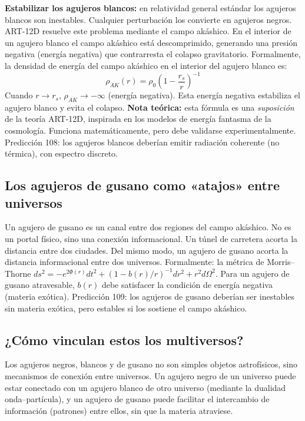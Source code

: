 \textbf{Estabilizar los agujeros blancos:} en relatividad general estándar los agujeros blancos son inestables. Cualquier perturbación los convierte en agujeros negros. ART-12D resuelve este problema mediante el campo akáshico. En el interior de un agujero blanco el campo akáshico está descomprimido, generando una presión negativa (energía negativa) que contrarresta el colapso gravitatorio. Formalmente, la densidad de energía del campo akáshico en el interior del agujero blanco es:
\begin{equation}
\rho_{AK}(r) = \rho_0 \left(1 - \frac{r_s}{r}\right)^{-1}
\end{equation}
Cuando $r \to r_s$, $\rho_{AK} \to -\infty$ (energía negativa). Esta energía negativa estabiliza el agujero blanco y evita el colapso. \textbf{Nota teórica:} esta fórmula es una \textit{suposición} de la teoría ART-12D, inspirada en los modelos de energía fantasma de la cosmología. Funciona matemáticamente, pero debe validarse experimentalmente. Predicción 108: los agujeros blancos deberían emitir radiación coherente (no térmica), con espectro discreto.

\subsection{Los agujeros de gusano como «atajos» entre universos}
Un agujero de gusano es un canal entre dos regiones del campo akáshico. No es un portal físico, sino una conexión informacional. Un túnel de carretera acorta la distancia entre dos ciudades. Del mismo modo, un agujero de gusano acorta la distancia informacional entre dos universos. Formalmente: la métrica de Morris--Thorne $ds^2 = -e^{2\Phi(r)}dt^2 + (1-b(r)/r)^{-1}dr^2 + r^2 d\Omega^2$. Para un agujero de gusano atravesable, $b(r)$ debe satisfacer la condición de energía negativa (materia exótica). Predicción 109: los agujeros de gusano deberían ser inestables sin materia exótica, pero estables si los sostiene el campo akáshico.

\subsection{¿Cómo vinculan estos los multiversos?}
Los agujeros negros, blancos y de gusano no son simples objetos astrofísicos, sino mecanismos de conexión entre universos. Un agujero negro de un universo puede estar conectado con un agujero blanco de otro universo (mediante la dualidad onda--partícula), y un agujero de gusano puede facilitar el intercambio de información (patrones) entre ellos, sin que la materia atraviese.

